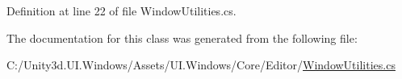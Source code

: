Definition at line 22 of file Window\+Utilities.\+cs.



The documentation for this class was generated from the following file\+:\begin{DoxyCompactItemize}
\item 
C\+:/\+Unity3d.\+U\+I.\+Windows/\+Assets/\+U\+I.\+Windows/\+Core/\+Editor/\hyperlink{_window_utilities_8cs}{Window\+Utilities.\+cs}\end{DoxyCompactItemize}
